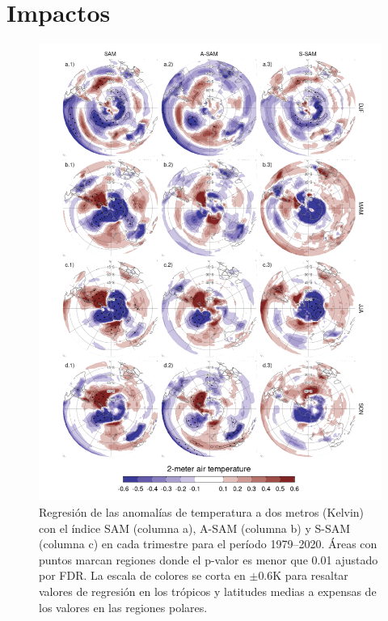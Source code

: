 \documentclass[12pt,oneside,a4paper]{reedthesis}
\begin{document}
\hypertarget{impacts}{%
\section{Impactos}\label{impacts}}



\begin{figure}

{\centering \includegraphics{figures/30-sam/regr-air-season-1} 

}

\caption{Regresión de las anomalías de temperatura a dos metros (Kelvin) con el índice SAM (columna a), A-SAM (columna b) y S-SAM (columna c) en cada trimestre para el período 1979--2020. Áreas con puntos marcan regiones donde el p-valor es menor que 0.01 ajustado por FDR. La escala de colores se corta en \(\pm0.6 \mathrm{K}\) para resaltar valores de regresión en los trópicos y latitudes medias a expensas de los valores en las regiones polares.}\label{fig:regr-air-season}
\end{figure}
\end{document}
